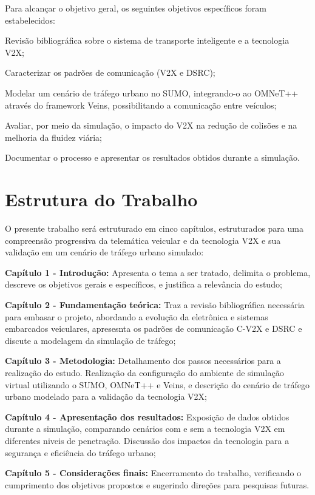 Para alcançar o objetivo geral, os seguintes objetivos específicos foram estabelecidos:
\begin{alineas}
    \item Revisão bibliográfica sobre o sistema de transporte inteligente e a tecnologia V2X;
    \item Caracterizar os padrões de comunicação (V2X e DSRC);
    \item Modelar um cenário de tráfego urbano no SUMO, integrando-o ao OMNeT++ através do framework Veins, possibilitando a comunicação entre veículos; 
    \item Avaliar, por meio da simulação, o impacto do V2X na redução de colisões e na melhoria da fluidez viária;
    \item Documentar o processo e apresentar os resultados obtidos durante a simulação.
\end{alineas}
    
\section{Estrutura do Trabalho}

O presente trabalho será estruturado em cinco capítulos, estruturados para uma compreensão progressiva da telemática veicular e da tecnologia V2X e sua validação
em um cenário de tráfego urbano simulado:
\begin{alineas}
    \item \textbf{Capítulo 1 - Introdução:} Apresenta o tema a ser tratado, delimita o problema, descreve os objetivos gerais e específicos, e justifica a relevância do
    estudo;
    \item \textbf{Capítulo 2 - Fundamentação teórica:} Traz a revisão bibliográfica necessária para embasar o projeto, abordando a evolução da eletrônica e sistemas
    embarcados veiculares, apresesnta os padrões de comunicação C-V2X e DSRC e discute a modelagem da simulação de tráfego;    
    \item \textbf{Capítulo 3 - Metodologia:} Detalhamento dos passos necessários para a realização do estudo. Realização da configuração do ambiente de simulação virtual
    utilizando o SUMO, OMNeT++ e Veins, e descrição do cenário de tráfego urbano modelado para a validação da tecnologia V2X;
    \item \textbf{Capítulo 4 - Apresentação dos resultados:} Exposição de dados obtidos durante a simulação, comparando cenários com e sem a tecnologia V2X em diferentes
    niveis de penetração. Discussão dos impactos da tecnologia para a segurança e eficiência do tráfego urbano;
    \item \textbf{Capítulo 5 - Considerações finais:} Encerramento do trabalho, verificando o cumprimento dos objetivos propostos e sugerindo direções para pesquisas
    futuras.
\end{alineas}

